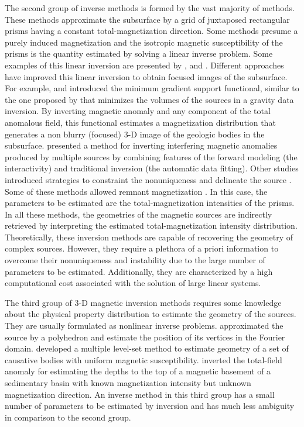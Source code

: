 The second group of inverse methods is formed by the vast majority of methods. 
These methods approximate the subsurface by a grid of juxtaposed rectangular prisms having 
a constant total-magnetization direction. Some methods presume a purely induced 
magnetization and the isotropic magnetic susceptibility of the prisms is the quantity estimated by solving a linear inverse problem. 
Some examples of this linear inversion are presented by \cite{cribb-1976}, \cite{li_3-d_1996} and \cite{pilkington_3-d_1997}.
Different approaches have improved this linear inversion to obtain focused images of the subsurface. 
For example, \cite{portniaguine_focusing_1999} and \cite{portniaguine_3d_2002} introduced the minimum gradient support functional, similar to the one proposed by
\cite{last-1983} that minimizes the volumes of the sources in a gravity data inversion. 
By inverting magnetic anomaly and any component of the total anomalous field, this functional estimates a magnetization distribution that generates a non blurry (focused) 3-D image of the geologic bodies in the subsurface.
\cite{barbosa_interactive_2006} presented a method for inverting interfering magnetic anomalies produced by multiple sources by combining features of the forward modeling (the interactivity) and traditional inversion (the automatic data fitting). Other studies introduced strategies to constraint the nonuniqueness and delineate the source \cite[]{tontini,pilkington_3d_2009,shamsipour_3d_2011,cella_inversion_2012,abedi-2015}. 
Some of these methods allowed remnant magnetization \cite[e.g., ][]{pignatelli-2006}. 
In this case, the parameters to be estimated are the total-magnetization intensities 
of the prisms. 
In all these methods, the geometries of the magnetic sources are indirectly retrieved by interpreting the estimated total-magnetization intensity 
distribution. 
Theoretically, these inversion methods are capable of recovering the geometry of complex 
sources. However, they require a plethora of a priori information to overcome 
their nonuniqueness and instability due to the large number of parameters 
to be estimated. Additionally, they are characterized by a high 
computational cost associated with the solution of large linear systems.

The third group of 3-D magnetic inversion methods requires some knowledge about the 
physical property distribution to estimate the geometry of the sources. 
They are usually formulated as nonlinear inverse problems. 
\cite{wang_inversion_1990} approximated the source by a polyhedron and estimate 
the position of its vertices in the Fourier domain. 
\cite{wenbin-2017} developed a multiple level-set method to estimate geometry 
of a set of causative bodies with uniform magnetic susceptibility. 
\cite{hidalgo-2019} inverted the total-field anomaly for estimating the depths to the top of a magnetic basement of a sedimentary basin with known magnetization intensity but unknown magnetization direction. 
An inverse method in this third group has a small number of parameters to be estimated by inversion and has much less ambiguity in comparison to the second group. 

